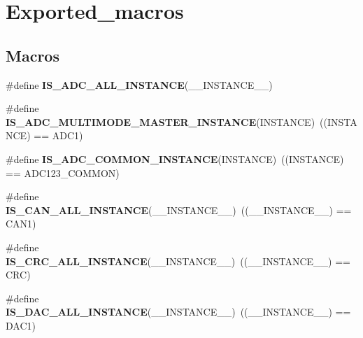 \hypertarget{group___exported__macros}{}\section{Exported\+\_\+macros}
\label{group___exported__macros}
\subsection*{Macros}
\begin{DoxyCompactItemize}
\item 
\#define {\bfseries I\+S\+\_\+\+A\+D\+C\+\_\+\+A\+L\+L\+\_\+\+I\+N\+S\+T\+A\+N\+CE}(\+\_\+\+\_\+\+I\+N\+S\+T\+A\+N\+C\+E\+\_\+\+\_\+)
\item 
\mbox{\label{group___exported__macros_ga26b4e299ac54d09082645a70f889c143}} 
\#define {\bfseries I\+S\+\_\+\+A\+D\+C\+\_\+\+M\+U\+L\+T\+I\+M\+O\+D\+E\+\_\+\+M\+A\+S\+T\+E\+R\+\_\+\+I\+N\+S\+T\+A\+N\+CE}(I\+N\+S\+T\+A\+N\+CE)~((I\+N\+S\+T\+A\+N\+CE) == A\+D\+C1)
\item 
\mbox{\label{group___exported__macros_gad8a5831c786b6b265531b890a194cbe2}} 
\#define {\bfseries I\+S\+\_\+\+A\+D\+C\+\_\+\+C\+O\+M\+M\+O\+N\+\_\+\+I\+N\+S\+T\+A\+N\+CE}(I\+N\+S\+T\+A\+N\+CE)~((I\+N\+S\+T\+A\+N\+CE) == A\+D\+C123\+\_\+\+C\+O\+M\+M\+ON)
\item 
\mbox{\label{group___exported__macros_ga22db660869cb9cd43f5e3b9a0fcc8cb3}} 
\#define {\bfseries I\+S\+\_\+\+C\+A\+N\+\_\+\+A\+L\+L\+\_\+\+I\+N\+S\+T\+A\+N\+CE}(\+\_\+\+\_\+\+I\+N\+S\+T\+A\+N\+C\+E\+\_\+\+\_\+)~((\+\_\+\+\_\+\+I\+N\+S\+T\+A\+N\+C\+E\+\_\+\+\_\+) == C\+A\+N1)
\item 
\mbox{\label{group___exported__macros_ga9949bbf30ea6e6cb9c41cc5cd24ab47a}} 
\#define {\bfseries I\+S\+\_\+\+C\+R\+C\+\_\+\+A\+L\+L\+\_\+\+I\+N\+S\+T\+A\+N\+CE}(\+\_\+\+\_\+\+I\+N\+S\+T\+A\+N\+C\+E\+\_\+\+\_\+)~((\+\_\+\+\_\+\+I\+N\+S\+T\+A\+N\+C\+E\+\_\+\+\_\+) == C\+RC)
\item 
\mbox{\label{group___exported__macros_ga99419fcd241f432e5bae5a37dff08753}} 
\#define {\bfseries I\+S\+\_\+\+D\+A\+C\+\_\+\+A\+L\+L\+\_\+\+I\+N\+S\+T\+A\+N\+CE}(\+\_\+\+\_\+\+I\+N\+S\+T\+A\+N\+C\+E\+\_\+\+\_\+)~((\+\_\+\+\_\+\+I\+N\+S\+T\+A\+N\+C\+E\+\_\+\+\_\+) == D\+A\+C1)

\end{DoxyCompactItemize}
